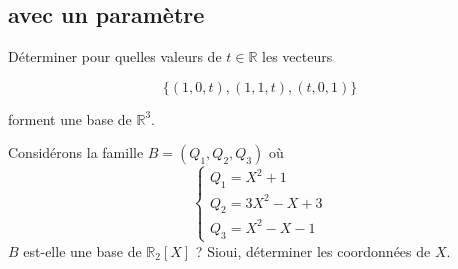 \vspace{2em}

\subsection{avec un paramètre}

Déterminer pour quelles valeurs de $t \in \mathbb{R}$ les vecteurs

$$
\{(1,0, t),(1,1, t),(t, 0,1)\}
$$

forment une base de $\mathbb{R}^3$.

\vspace{2em}
Considérons la famille $B=\left(Q_1, Q_2, Q_3\right)$ où $$\left\{\begin{array}{l}Q_1=X^2+1 \\ Q_2=3 X^2-X+3 \\ Q_3=X^2-X-1\end{array}\right.$$
$B$ est-elle une base de $\mathbb{R}_2[X]$ ? Sioui, déterminer les coordonnées de $X$.
  
